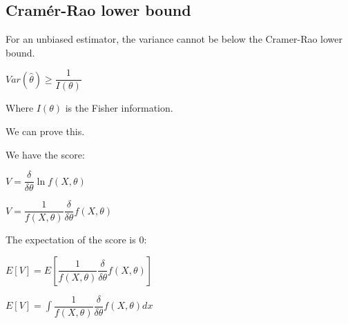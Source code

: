 
\subsection{Cramér-Rao lower bound}

For an unbiased estimator, the variance cannot be below the Cramer-Rao lower bound.

\(Var (\hat \theta )\ge \dfrac{1}{I(\theta )}\)

Where \(I(\theta )\) is the Fisher information.

We can prove this.

We have the score:

\(V=\dfrac{\delta }{\delta \theta }\ln f(X, \theta )\)

\(V=\dfrac{1}{f(X, \theta )}\dfrac{\delta }{\delta \theta } f(X, \theta )\)

The expectation of the score is \(0\):

\(E[V]=E[\dfrac{1}{f(X, \theta )}\dfrac{\delta }{\delta \theta } f(X, \theta )]\)

\(E[V]=\int \dfrac{1}{f(X, \theta )}\dfrac{\delta }{\delta \theta } f(X, \theta )dx\)

